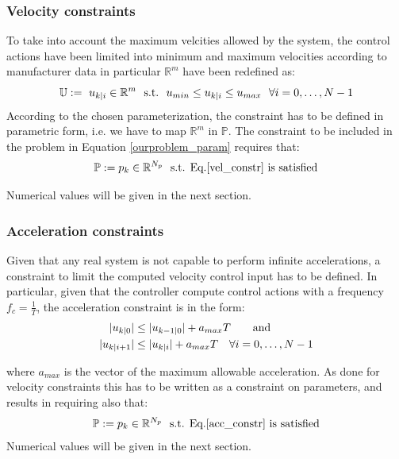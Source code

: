\subsubsection*{Velocity constraints}
	To take into account the maximum velcities allowed by the system, the control actions have been limited into minimum and maximum velocities according to manufacturer data in particular $\mathbb{R}^m$ have been redefined as:
	\begin{equation}
	\mathbb{U}:=\ {u}_{k|i} \in \mathbb{R}^m\ \ \textnormal{s.t.}\ \ u_{min}\leq{u_{k|i}}\leq u_{max}\ \ \forall i=0,\dots, N-1
	\label{vel_constr}
	\end{equation}
	According to the chosen parameterization, the constraint has to be defined in parametric form, i.e. we have to map $\mathbb{R}^m$ in $\mathbb{P}$. The constraint to be included in the problem in Equation \ref{ourproblem_param} requires that:
	\begin{equation*}
		\mathbb{P}:=p_k \in \mathbb{R}^{N_p}\ \textnormal{ s.t. Eq.\ref{vel_constr} is satisfied}
	\end{equation*}

	Numerical values will be given in the next section.
\subsubsection*{Acceleration constraints}
	Given that any real system is not capable to perform infinite accelerations, a constraint to limit the computed velocity control input has to be defined. In particular, given that the controller compute control actions with a frequency $f_c=\frac{1}{T}$, the acceleration constraint is in the form:
	\begin{equation}
		\begin{split}
			\lvert u_{k|0}\rvert &\leq \lvert u_{k-1|0}\rvert + a_{max} T\qquad \textnormal{and}\\
			\lvert u_{k|i+1}\rvert &\leq \lvert u_{k|i}\rvert + a_{max} T\quad  \forall i=0,\dots,N-1
		\end{split}	
		\label{acc_constr}
	\end{equation}  

	where $a_{max}$ is the vector of the maximum allowable acceleration. As done for velocity constraints this has to be written as a constraint on parameters, and results in requiring also that:
	\begin{equation*}
		\mathbb{P}:=p_k \in \mathbb{R}^{N_p}\ \textnormal{ s.t. Eq.\ref{acc_constr} is satisfied}
	\end{equation*}
	Numerical values will be given in the next section. 

